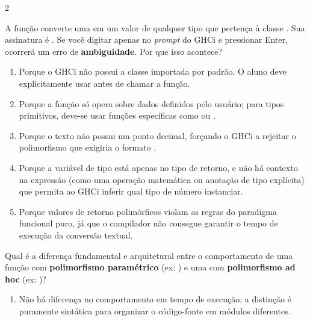 \documentclass[a4paper,10pt,brazil]{article}
\begin{document}
\begin{multicols}{2}
\begin{enumerate}
\end{enumerate}

A função  converte uma  em um valor de qualquer tipo que pertença à classe . Sua assinatura é . 
Se você digitar apenas  no \emph{prompt} do GHCi e pressionar Enter, ocorrerá um erro de \textbf{ambiguidade}. Por que isso acontece?

\begin{enumerate}
  \item Porque o GHCi não possui a classe  importada por padrão. O aluno deve explicitamente usar  antes de chamar a função.

  \item Porque a função  só opera sobre dados definidos pelo usuário; para tipos primitivos, deve-se usar funções específicas como  ou .

  \item Porque o texto  não possui um ponto decimal, forçando o GHCi a rejeitar o polimorfismo que exigiria o formato .

  \item Porque a variável de tipo  está apenas no tipo de retorno, e não há contexto na expressão (como uma operação matemática ou anotação de tipo explícita) que permita ao GHCi inferir qual tipo de número instanciar.

  \item Porque valores de retorno polimórficos violam as regras do paradigma funcional puro, já que o compilador não consegue garantir o tempo de execução da conversão textual.


\end{enumerate}

Qual é a diferença fundamental e arquitetural entre o comportamento de uma função com \textbf{polimorfismo paramétrico} (ex: ) e uma com \textbf{polimorfismo ad hoc} (ex: )?

\begin{enumerate}
  \item Não há diferença no comportamento em tempo de execução; a distinção é puramente sintática para organizar o código-fonte em módulos diferentes.


\end{enumerate}
\end{multicols}
\end{document}
